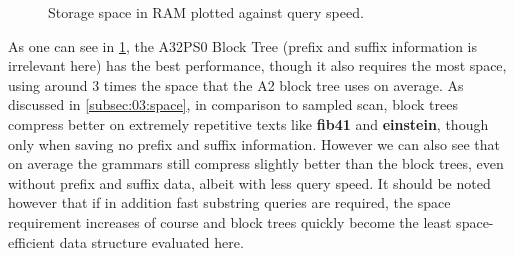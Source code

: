 \documentclass{scrartcl}
\begin{document}
\begin{figure}[h]
	\caption{Storage space in RAM plotted against query speed.}
	\label{fig:03:spacetimera}
\end{figure}

As one can see in \cref{fig:03:spacetimera}, the A32PS0 Block Tree (prefix and suffix information is irrelevant here)
has the best performance, though it also requires the most space, using around 3 times the space that the A2 block tree uses on average.
As discussed in \cref{subsec:03:space}, in comparison to sampled scan, block trees compress better on extremely repetitive texts like \textbf{fib41} and \textbf{einstein}, though only when saving no prefix and suffix information.
However we can also see that on average the grammars still compress slightly better than the block trees, even without prefix and suffix data, albeit with less query speed.
It should be noted however that if in addition fast substring queries are required, the space requirement increases of course and block trees quickly become the least space-efficient data structure evaluated here.
\end{document}
